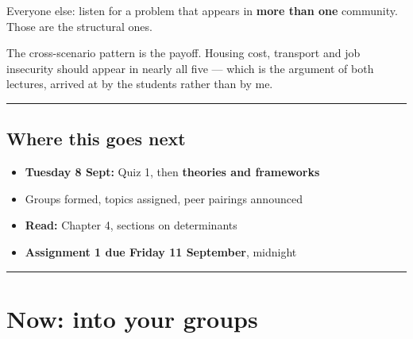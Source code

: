 \documentclass[
  letterpaper,
  DIV=11,
  numbers=noendperiod]{scrartcl}
\providecommand{\tightlist}{%
  \setlength{\itemsep}{0pt}\setlength{\parskip}{0pt}}
\begin{document}
Everyone else: listen for a problem that appears in \textbf{more than
one} community. Those are the structural ones.

The cross-scenario pattern is the payoff. Housing cost, transport and
job insecurity should appear in nearly all five --- which is the
argument of both lectures, arrived at by the students rather than by me.

\begin{center}\rule{0.5\linewidth}{0.5pt}\end{center}

\subsection{\texorpdfstring{{\textbf{Where this goes
next}}}{Where this goes next}}\label{where-this-goes-next}

\begin{itemize}
\tightlist
\item
  \textbf{Tuesday 8 Sept:} Quiz 1, then \textbf{theories and frameworks}
\item
  Groups formed, topics assigned, peer pairings announced
\item
  \textbf{Read:} Chapter 4, sections on determinants
\item
  \textbf{Assignment 1 due Friday 11 September}, midnight
\end{itemize}

\begin{center}\rule{0.5\linewidth}{0.5pt}\end{center}

\section{\texorpdfstring{{\textbf{Now: into your
groups}}}{Now: into your groups}}\label{now-into-your-groups}
\end{document}
